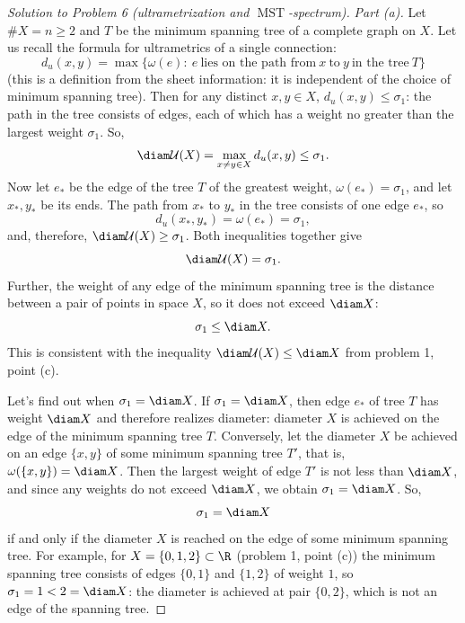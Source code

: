 \documentclass[a4paper,12pt]{report}
\begin{document}
\begin{proof}[Solution to Problem \textup{6} \textup{(}ultrametrization and $\operatorname{MST}$-spectrum\textup{)}]
\textit{Part \textup{(a)}.} Let $\#X=n\ge2$ and $T$ be the minimum spanning tree of a complete graph on $X$. Let us recall the formula for ultrametrics of a single connection\textup{:}
\[
d_u(x,y)=\max\bigl\{\omega(e):\ e\ \text{lies on the path from}\ x\ \text{to}\ y\ \text{in the tree}\ T\bigr\}
\]
\textup{(}this is a definition from the sheet information\textup{:} it is independent of the choice of minimum spanning tree\textup{)}. Then for any distinct $x,y\in X$, $d_u(x,y)\le\sigma_1$\textup{:} the path in the tree consists of edges, each of which has a weight no greater than the largest weight $\sigma_1$. So,
\[
\diam\mathcal U(X)=\max_{x\ne y\in X}d_u(x,y)\le\sigma_1 .
\]
Now let $e_*$ be the edge of the tree $T$ of the greatest weight, $\omega(e_*)=\sigma_1$, and let $x_*,y_*$ be its ends. The path from $x_*$ to $y_*$ in the tree consists of one edge $e_*$, so
\[
d_u(x_*,y_*)=\omega(e_*)=\sigma_1 ,
\]
and, therefore, $\diam\mathcal U(X)\ge\sigma_1$. Both inequalities together give
\[
\diam\mathcal U(X)=\sigma_1 .
\]
Further, the weight of any edge of the minimum spanning tree is the distance between a pair of points in space $X$, so it does not exceed $\diam X$\textup{:}
\[
\sigma_1\le\diam X .
\]
This is consistent with the inequality $\diam\mathcal U(X)\le\diam X$ from problem \textup{1}, point \textup{(c)}.

Let's find out when $\sigma_1=\diam X$. If $\sigma_1=\diam X$, then edge $e_*$ of tree $T$ has weight $\diam X$ and therefore realizes diameter\textup{:} diameter $X$ is achieved on the edge of the minimum spanning tree $T$. Conversely, let the diameter $X$ be achieved on an edge $\{x,y\}$ of some minimum spanning tree $T'$, that is, $\omega(\{x,y\})=\diam X$. Then the largest weight of edge $T'$ is not less than $\diam X$, and since any weights do not exceed $\diam X$, we obtain $\sigma_1=\diam X$. So,
\[
\sigma_1=\diam X
\]
if and only if the diameter $X$ is reached on the edge of some minimum spanning tree.
For example, for $X=\{0,1,2\}\subset\R$ \textup{(}problem \textup{1}, point \textup{(c)}\textup{)} the minimum spanning tree consists of edges $\{0,1\}$ and $\{1,2\}$ of weight $1$, so $\sigma_1=1<2=\diam X$\textup{:} the diameter is achieved at pair $\{0,2\}$, which is not an edge of the spanning tree.


\end{proof}
\end{document}
